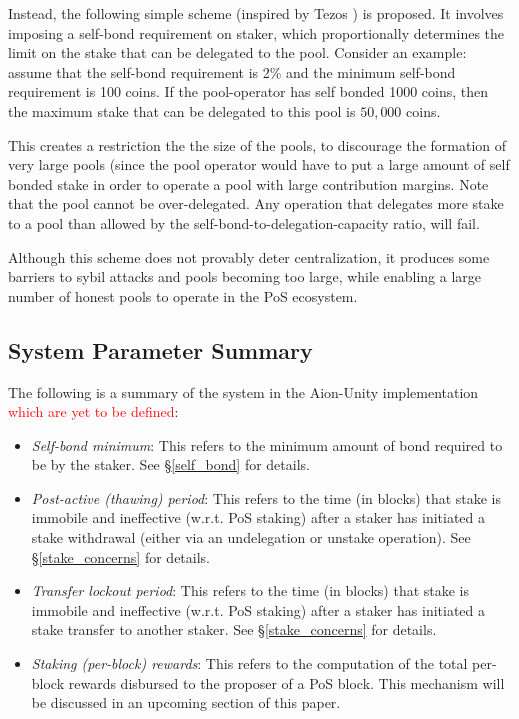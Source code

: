 Instead, the following simple scheme (inspired by Tezos \cite{Goo14}) is proposed. It involves imposing a self-bond requirement on staker, which proportionally determines the limit on the stake that can be delegated to the pool. Consider an example: assume that the self-bond requirement is 2\% and the minimum self-bond requirement is 100 coins. If the pool-operator has self bonded 1000 coins, then the maximum stake that can be delegated to this pool is $50,000$ coins.   

This creates a restriction the the size of the pools, to discourage the formation of very large pools (since the pool operator would have to put a large amount of self bonded stake in order to operate a pool with large contribution margins. Note that the pool cannot be over-delegated. Any operation that delegates more stake to a pool than allowed by the self-bond-to-delegation-capacity ratio, will fail. 

Although this scheme does not provably deter centralization, it produces some barriers to sybil attacks and pools becoming too large, while enabling a large number of honest pools to operate in the PoS ecosystem.  

\subsection{System Parameter Summary} \label{unspecified_parameters}
The following is a summary of the system in the Aion-Unity implementation \textcolor{red}{which are yet to be defined}: 
\begin{itemize}
    \item \textit{Self-bond minimum}: This refers to the minimum amount of bond required to be  by the staker. See \S\ref{self_bond} for details.
    \item \textit{Post-active (thawing) period}: This refers to the time (in blocks) that stake is immobile and ineffective (w.r.t. PoS staking) after a staker has initiated a stake withdrawal (either via an undelegation or unstake operation). See \S\ref{stake_concerns} for details. 
    \item \textit{Transfer lockout period}: This refers to the time (in blocks) that stake is immobile and ineffective (w.r.t. PoS staking) after a staker has initiated a stake transfer to another staker. See \S\ref{stake_concerns} for details. 
    \item \textit{Staking (per-block) rewards}: This refers to the computation of the total per-block rewards disbursed to the proposer of a PoS block. This mechanism will be discussed in an upcoming section of this paper. 
\end{itemize}


